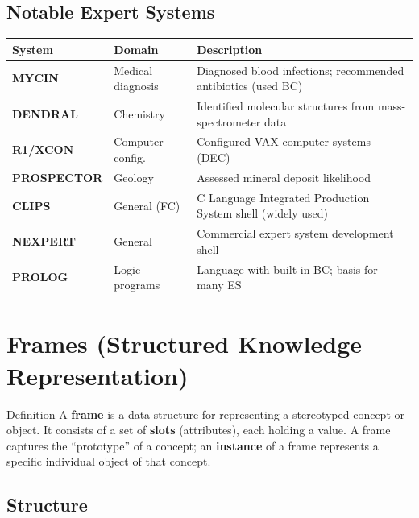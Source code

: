 \documentclass[12pt,a4paper]{article}
\begin{document}
\subsection{Notable Expert Systems}

\begin{center}
\renewcommand{\arraystretch}{1.3}
\begin{tabular}{>{\bfseries}p{2.8cm} p{3.2cm} p{7.5cm}}
\toprule
System & Domain & Description \\
\midrule
MYCIN & Medical diagnosis & Diagnosed blood infections; recommended antibiotics (used BC) \\
DENDRAL & Chemistry & Identified molecular structures from mass-spectrometer data \\
R1/XCON & Computer config. & Configured VAX computer systems (DEC) \\
PROSPECTOR & Geology & Assessed mineral deposit likelihood \\
CLIPS & General (FC) & C Language Integrated Production System shell (widely used) \\
NEXPERT & General & Commercial expert system development shell \\
PROLOG & Logic programs & Language with built-in BC; basis for many ES \\
\bottomrule
\end{tabular}
\end{center}

\section{Frames (Structured Knowledge Representation)}

\begin{defbox}{Definition}
A \textbf{frame} is a data structure for representing a stereotyped concept or object.
It consists of a set of \textbf{slots} (attributes), each holding a value.
A frame captures the ``prototype'' of a concept; an \textbf{instance} of a frame
represents a specific individual object of that concept.
\end{defbox}

\subsection{Structure}
\end{document}
